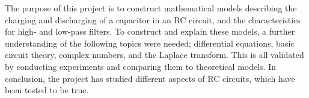 The purpose of this project is to construct mathematical models describing the charging and discharging of a capacitor in an RC circuit, and the characteristics for high- and low-pass filters. To construct and explain these models, a further understanding of the following topics were needed; differential equations, basic circuit theory, complex numbers, and the Laplace transform. This is all validated by conducting experiments and comparing them to theoretical models. In conclusion, the project has studied different aspects of RC circuits, which have been tested to be true.